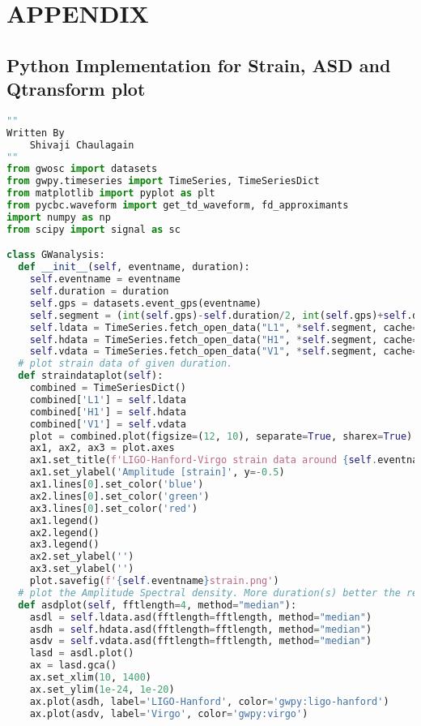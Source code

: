 \appendix
\renewcommand{\thesection}{\Alph{section}.}

\chapter*{APPENDIX}
\onehalfspacing


\section{Python Implementation for Strain, ASD and Qtransform plot}
\label{code1}

\begin{lstlisting}[language=Python, caption=Preprocessing Implementation in python]
""
Written By
    Shivaji Chaulagain
""
from gwosc import datasets
from gwpy.timeseries import TimeSeries, TimeSeriesDict
from matplotlib import pyplot as plt
from pycbc.waveform import get_td_waveform, fd_approximants
import numpy as np
from scipy import signal as sc

class GWanalysis:
  def __init__(self, eventname, duration):
    self.eventname = eventname
    self.duration = duration
    self.gps = datasets.event_gps(eventname)
    self.segment = (int(self.gps)-self.duration/2, int(self.gps)+self.duration/2)
    self.ldata = TimeSeries.fetch_open_data("L1", *self.segment, cache=True)
    self.hdata = TimeSeries.fetch_open_data("H1", *self.segment, cache=True)
    self.vdata = TimeSeries.fetch_open_data("V1", *self.segment, cache=True)
  # plot strain data of given duration.
  def straindataplot(self):
    combined = TimeSeriesDict()
    combined['L1'] = self.ldata
    combined['H1'] = self.hdata
    combined['V1'] = self.vdata
    plot = combined.plot(figsize=(12, 10), separate=True, sharex=True)
    ax1, ax2, ax3 = plot.axes
    ax1.set_title(f'LIGO-Hanford-Virgo strain data around {self.eventname} of duration {self.duration}s')
    ax1.set_ylabel('Amplitude [strain]', y=-0.5)
    ax1.lines[0].set_color('blue')
    ax2.lines[0].set_color('green')
    ax3.lines[0].set_color('red')
    ax1.legend()
    ax2.legend()
    ax3.legend()
    ax2.set_ylabel('')
    ax3.set_ylabel('')
    plot.savefig(f'{self.eventname}strain.png')
  # plot the Amplitude Spectral density. More duration(s) better the resolution of frequency component
  def asdplot(self, fftlength=4, method="median"):
    asdl = self.ldata.asd(fftlength=fftlength, method="median")
    asdh = self.hdata.asd(fftlength=fftlength, method="median")
    asdv = self.vdata.asd(fftlength=fftlength, method="median")
    lasd = asdl.plot()
    ax = lasd.gca()
    ax.set_xlim(10, 1400)
    ax.set_ylim(1e-24, 1e-20)
    ax.plot(asdh, label='LIGO-Hanford', color='gwpy:ligo-hanford')
    ax.plot(asdv, label='Virgo', color='gwpy:virgo')


\end{lstlisting}

